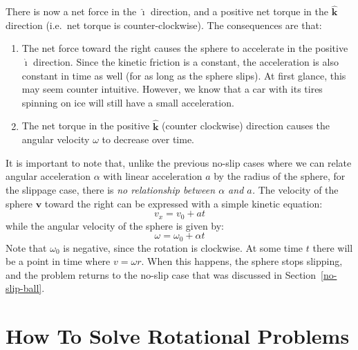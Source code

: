 \documentclass[11pt]{article}
\newcommand{\mb}[1]{\mathbf{#1}}
\newcommand{\iii}{\bm{\hat{\imath}}}
\newcommand{\kkk}{\bm{\hat{k}}}
\begin{document}
There is now a net force in the $\iii$ direction, and a positive net torque in
the $\kkk$ direction (i.e.\ net torque is counter-clockwise). The consequences
are that:
\begin{enumerate}[topsep=0pt]
\item The net force toward the right causes the sphere to accelerate in the
  positive $\iii$ direction. Since the kinetic friction is a constant, the
  acceleration is also constant in time as well (for as long as the sphere
  slips). At first glance, this may seem counter intuitive. However, we know
  that a car with its tires spinning on ice will still have a small
  acceleration.
\item The net torque in the positive $\kkk$ (counter clockwise) direction
  causes the angular velocity $\omega$ to decrease over time.
\end{enumerate}
It is important to note that, unlike the previous no-slip cases where we can 
relate angular acceleration $\alpha$ with linear acceleration $a$ by the radius
of the sphere, for the slippage case, there is \emph{no relationship between
  $\alpha$ and $a$.} The velocity of the sphere $\mb{v}$ toward the right can
be expressed with a simple kinetic equation:
\begin{equation}
  v_x=v_0+at
\end{equation}
while the angular velocity of the sphere is given by:
\begin{equation}
  \omega=\omega_0+\alpha t
\end{equation}
Note that $\omega_0$ is negative, since the rotation is clockwise. At some time
$t$ there will be a point in time where $v=\omega r$. When this happens, the
sphere stops slipping, and the problem returns to the no-slip case that was
discussed in Section~\ref{no-slip-ball}.

\section{How To Solve Rotational Problems}
\end{document}
